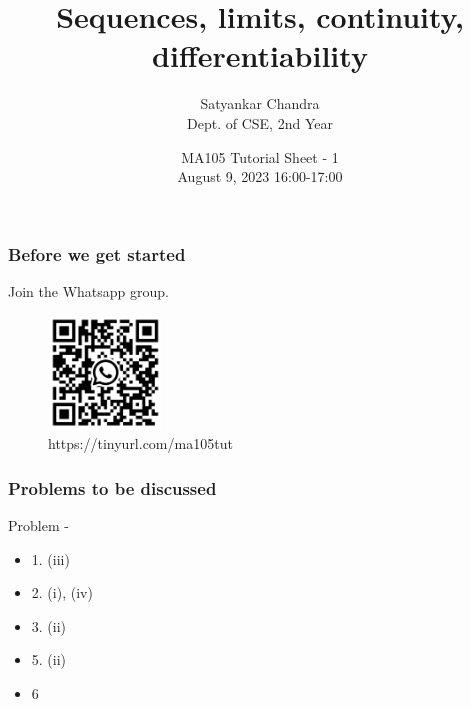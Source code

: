 \documentclass[
	11pt, %
]{beamer}
\title[Tut 1]{Sequences, limits, continuity, differentiability} %
\author[Satyankar Chandra]{Satyankar Chandra \\ \scriptsize Dept. of CSE, 2nd Year} %
\date[August 9, 2023]{MA105 Tutorial Sheet - 1 \\ \scriptsize August 9, 2023 16:00-17:00} %
\begin{document}
\begin{frame}
	\frametitle{Before we get started}
	Join the Whatsapp group.
	\begin{figure}
		\centering
		\includegraphics[width=3cm]{./qr.jpeg}
		\caption{https://tinyurl.com/ma105tut}
	\end{figure}
	
\end{frame}


\begin{frame}
	\titlepage %
\end{frame}



\begin{frame}
	\frametitle{Problems to be discussed} %
	
	Problem -
	\begin{itemize}
		\item 1. (iii)
		\item 2. (i), (iv)
		\item 3. (ii)
		\item 5. (ii)
		\item 6
	\end{itemize}
\end{frame}
\end{document}
